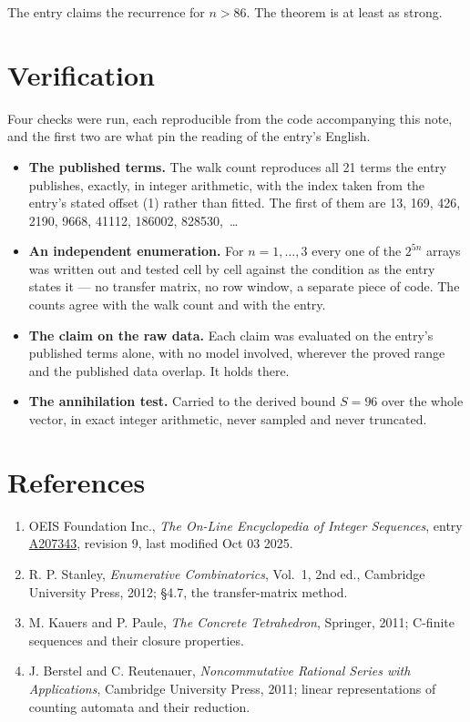 \documentclass[11pt]{article}
\theoremstyle{definition}
\begin{document}
The entry claims the recurrence for $n > 86$. The theorem is at least as strong.

\section{Verification}

Four checks were run, each reproducible from the code accompanying this note, and the first two are what pin the reading of the entry's English.

\begin{itemize}

\item {\bfseries The published terms.} The walk count reproduces all 21 terms the entry publishes, exactly, in integer arithmetic, with the index taken from the entry's stated offset (1) rather than fitted. The first of them are 13, 169, 426, 2190, 9668, 41112, 186002, 828530,~\dots

\item {\bfseries An independent enumeration.} For $n = 1,\dots,3$ every one of the $2^{5n}$ arrays was written out and tested cell by cell against the condition as the entry states it --- no transfer matrix, no row window, a separate piece of code. The counts agree with the walk count and with the entry.

\item {\bfseries The claim on the raw data.} Each claim was evaluated on the entry's published terms alone, with no model involved, wherever the proved range and the published data overlap. It holds there.

\item {\bfseries The annihilation test.} Carried to the derived bound $S = 96$ over the whole vector, in exact integer arithmetic, never sampled and never truncated.

\end{itemize}

\section{References}

\begin{enumerate}

\item OEIS Foundation Inc., \emph{The On-Line Encyclopedia of Integer Sequences}, entry \href{https://oeis.org/A207343}{A207343}, revision 9, last modified Oct 03 2025.

\item R. P. Stanley, \emph{Enumerative Combinatorics}, Vol.~1, 2nd ed., Cambridge University Press, 2012; \S4.7, the transfer-matrix method.

\item M. Kauers and P. Paule, \emph{The Concrete Tetrahedron}, Springer, 2011; C-finite sequences and their closure properties.

\item J. Berstel and C. Reutenauer, \emph{Noncommutative Rational Series with Applications}, Cambridge University Press, 2011; linear representations of counting automata and their reduction.

\end{enumerate}
\end{document}
